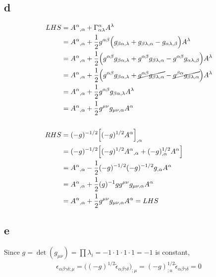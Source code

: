 \documentclass{article}
\begin{document}
\subsection*{d}
\begin{align*}
LHS &= A^\alpha{}_{,\alpha} + \Gamma^{\alpha}_{\alpha\lambda}A^\lambda \\
&= A^\alpha{}_{,\alpha} + \frac{1}{2}g^{\alpha\beta}\Big(g_{\beta\alpha,\lambda} + g_{\beta\lambda, \alpha} - g_{\alpha\lambda,\beta}\Big)A^\lambda \\
&= A^\alpha{}_{,\alpha} + \frac{1}{2}\Big(g^{\alpha\beta}g_{\beta\alpha,\lambda} + g^{\alpha\beta}g_{\beta\lambda, \alpha} -  g^{\alpha\beta}g_{\alpha\lambda,\beta}\Big)A^\lambda \\
&= A^\alpha{}_{,\alpha} + \frac{1}{2}\Big(g^{\alpha\beta}g_{\beta\alpha,\lambda} + \cancel{g^{\alpha\beta}g_{\beta\lambda, \alpha}} -  \cancel{g^{\beta\alpha}g_{\beta\lambda,\alpha}} \Big)A^\lambda  \\
&= A^\alpha{}_{,\alpha} + \frac{1}{2}g^{\alpha\beta}g_{\beta\alpha,\lambda}A^\lambda \\
&= A^\alpha{}_{,\alpha} + \frac{1}{2}g^{\mu\nu}g_{\mu\nu,\alpha}A^\alpha \\\\
RHS &= (-g)^{-1/2}\Big[(-g)^{1/2}A^\alpha\Big]_{,\alpha} \\
&= (-g)^{-1/2}\Big[(-g)^{1/2}A^\alpha{}_{,\alpha} + (-g)^{1/2}_{,\alpha}A^\alpha \Big] \\
& = A^\alpha{}_{,\alpha} - \frac{1}{2}(-g)^{-1/2} (-g)^{-1/2}g_{,\alpha}A^\alpha \\ 
& = A^\alpha{}_{,\alpha} + \frac{1}{2}(g)^{-1}gg^{\mu\nu}g_{\mu\nu,\alpha} A^\alpha \\ 
& = A^\alpha{}_{,\alpha} + \frac{1}{2}g^{\mu\nu}g_{\mu\nu,\alpha} A^\alpha = LHS \\ 
\end{align*}
\subsection*{e}
Since $g = \det(g_{\mu\nu}) = \prod \lambda_i = -1 \cdot 1 \cdot 1 \cdot 1 = -1$ is constant,
\begin{align*}
\epsilon_{\alpha\beta\gamma\delta;\mu} = \Big((-g)^{1/2}\tilde{\epsilon}_{\alpha\beta\gamma\delta}\Big)_{;\mu}
= (-g)^{1/2}_{;u}\tilde{\epsilon}_{\alpha\beta\gamma\delta} = 0
\end{align*}
\section{}
\end{document}
